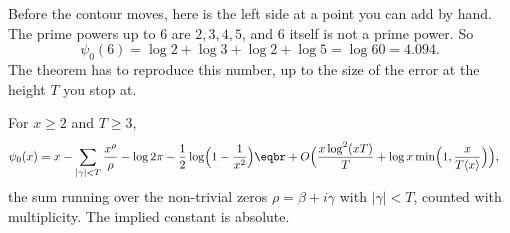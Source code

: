 Before the contour moves, here is the left side at a point you can add by hand. The prime powers up to $6$ are $2,3,4,5$, and $6$ itself is not a prime power. So
\[
\psi_0(6)=\log2+\log3+\log2+\log5=\log60=4.094.
\]
The theorem has to reproduce this number, up to the size of the error at the height $T$ you stop at.

\begin{theorem}\label{thm:explicit}
For $x\ge2$ and $T\ge3$,
\[
\begin{aligned}\psi_0(x)&=x-\sum_{|\gamma|<T}\frac{x^\rho}\rho-\log2\pi-\frac12\log\Bigl(1-\frac1{x^2}\Bigr)\eqbr+O\Bigl(\frac{x\log^2(xT)}T+\log x\min\Bigl(1,\frac x{T\langle x\rangle}\Bigr)\Bigr),\end{aligned}
\]
the sum running over the non-trivial zeros $\rho=\beta+i\gamma$ with $|\gamma|<T$, counted with multiplicity. The implied constant is absolute.
\end{theorem}
